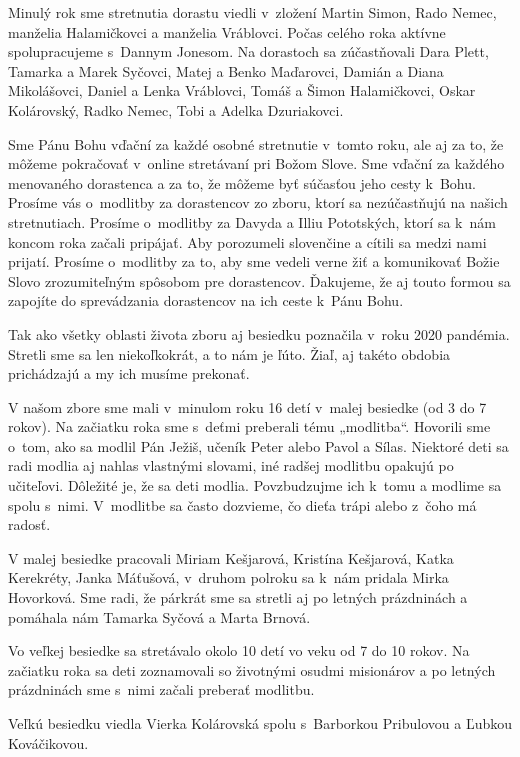 Minulý rok sme stretnutia dorastu viedli v~zložení Martin Simon, Rado Nemec, manželia Halamičkovci a manželia Vráblovci. Počas celého roka aktívne spolupracujeme s~Dannym Jonesom. Na dorastoch sa zúčastňovali Dara Plett, Tamarka a Marek Syčovci, Matej a Benko Maďarovci, Damián a Diana Mikolášovci, Daniel a Lenka Vráblovci, Tomáš a Šimon Halamičkovci, Oskar Kolárovský, Radko Nemec, Tobi a Adelka Dzuriakovci.

Sme Pánu Bohu vďační za každé osobné stretnutie v~tomto roku, ale aj za to, že môžeme pokračovať v~online stretávaní pri Božom Slove. Sme vďační za každého menovaného dorastenca a za to, že môžeme byť súčasťou jeho cesty k~Bohu. Prosíme vás o~modlitby za dorastencov zo zboru, ktorí sa nezúčastňujú na našich stretnutiach. Prosíme o~modlitby za Davyda a Illiu Pototských, ktorí sa k~nám koncom roka začali pripájať. Aby porozumeli slovenčine a cítili sa medzi nami prijatí. Prosíme o~modlitby za to, aby sme vedeli verne žiť a komunikovať Božie Slovo zrozumiteľným spôsobom pre dorastencov. Ďakujeme, že aj touto formou sa zapojíte do sprevádzania dorastencov na ich ceste k~Pánu Bohu.



Tak ako všetky oblasti života zboru aj besiedku poznačila v~roku 2020 pandémia. Stretli sme sa len niekoľkokrát, a to nám je ľúto. Žiaľ, aj takéto obdobia prichádzajú a my ich musíme prekonať.

V našom zbore sme mali v~minulom roku 16 detí v~malej besiedke (od 3 do 7 rokov). Na začiatku roka sme s~deťmi preberali tému „modlitba“. Hovorili sme o~tom, ako sa modlil Pán Ježiš, učeník Peter alebo Pavol a Sílas. Niektoré deti sa radi modlia aj nahlas vlastnými slovami, iné radšej modlitbu opakujú po učiteľovi. Dôležité je, že sa deti modlia. Povzbudzujme ich k~tomu a modlime sa spolu s~nimi. V~modlitbe sa často dozvieme, čo dieťa trápi alebo z~čoho má radosť.

V malej besiedke pracovali Miriam Kešjarová, Kristína Kešjarová, Katka Kerekréty, Janka Máťušová, v~druhom polroku sa k~nám pridala Mirka Hovorková. Sme radi, že párkrát sme sa stretli aj po letných prázdninách a pomáhala nám Tamarka Syčová a Marta Brnová.

Vo veľkej besiedke sa stretávalo okolo 10 detí vo veku od 7 do 10 rokov. Na začiatku roka sa deti zoznamovali so životnými osudmi misionárov a po letných prázdninách sme s~nimi začali preberať modlitbu.

Veľkú besiedku viedla Vierka Kolárovská spolu s~Barborkou Pribulovou a Ľubkou Kováčikovou.

